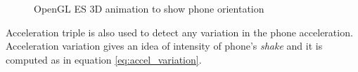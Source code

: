 \documentclass[conference, 11pt]{IEEEtran}
\begin{document}
\begin{figure}[!ht]
\begin{center}
\caption{OpenGL ES 3D animation to show phone orientation}
\label{img:opengl}
\end{center}
\end{figure}


Acceleration triple is also used to detect any variation in the phone acceleration. Acceleration variation gives an idea of intensity of phone's \textit{shake} and it is computed as in equation \ref{eq:accel_variation}.\\
\end{document}
